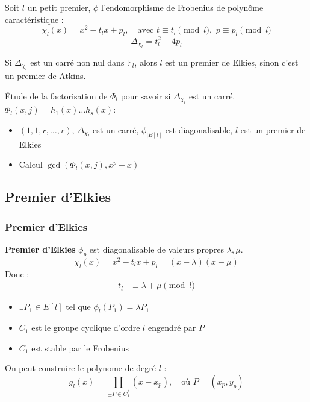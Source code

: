 \documentclass{beamer}
\begin{document}
\begin{frame}
Soit $l$ un petit premier, $\phi$ l'endomorphisme de Frobenius de polynôme caractéristique :
$$\chi_l(x) = x^2 - t_lx +p_l, \quad \text{avec } t \equiv t_l \pmod l , \, \,p \equiv p_l \pmod l$$ 
\newline 
$$\Delta_{\chi_l} = t_l^2 -4p_l $$
\begin{definition}
Si $\Delta_{\chi_l}$ est un carré non nul dans $\mathbb{F}_l$, alors $l$ est un premier de Elkies, sinon c'est un premier de Atkins.
\end{definition}
Étude de la factorisation de $\Phi_l$ pour savoir si $\Delta_{\chi_l}$ est un carré. 
\newline
$\Phi_l(x,j) = h_1(x)\ldots h_s(x)$:
\begin{itemize}
\item $(1,1,r,\ldots,r)$, $\Delta_{\chi_l}$ est un carré, $\phi_{|E[l]}$ est diagonalisable, $l$ est un premier de Elkies
\item Calcul $\gcd(\Phi_l(x,j), x^p - x)$
\end{itemize}
\end{frame}
\subsection{Premier d'Elkies}
\begin{frame}
\frametitle{Premier d'Elkies}
\textbf{Premier d'Elkies}
\newline
$\phi_p$ est diagonalisable de valeurs propres $\lambda, \mu$. 
$$\chi_l(x) = x^2 - t_lx +p_l =(x-\lambda)(x-\mu)$$
Donc :
\begin{align*}
t_l &\equiv \lambda + \mu \pmod l
\end{align*}
\begin{itemize}
\item $\exists P_1 \in E[l]$ tel que $\phi_l(P_1) = \lambda P_1$
\item $C_1$ est le groupe cyclique d'ordre $l$ engendré par $P$
\item $C_1$ est stable par le Frobenius 
\end{itemize}
On peut construire le polynome de degré $l$ :
$$ g_l(x) = \prod_{\pm P \in C_1^*} (x - x_p), \quad \text{où } P = (x_p, y_p) $$
\end{frame}
\end{document}

